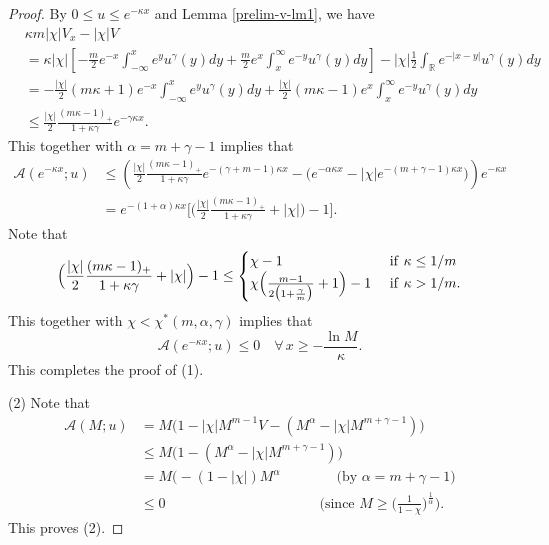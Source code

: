 \documentclass[11pt]{article} %
\theoremstyle{remark}
\theoremstyle{remark}
\numberwithin{equation}{section}
\numberwithin{figure}{section}
\numberwithin{table}{section}
\def\R{\mathbb R}
\begin{document}
\begin{proof}
By $0\le u\le e^{-\kappa x}$ and Lemma \ref{prelim-v-lm1}, we have 
\begin{align*}
&\kappa m |\chi| V_x-|\chi|V\\
&= \kappa |\chi|\left[ -\frac{m }{2}e^{- x}\int_{-\infty}^xe^{ y}u^\gamma (y)dy + \frac{m }{2}e^{x}\int_{x}^{\infty}e^{- y}u^\gamma (y)dy\right]-|\chi| \frac{1 }{2}\int_{\R}e^{- |x-y|}u^\gamma (y)dy
\\
&=-\frac{|\chi|}{2}(m\kappa +1)e^{-x}\int_{-\infty}^ x e^y u^\gamma (y)dy +\frac{|\chi|}{2}(m\kappa-1)e^{x}\int_x^\infty e^{-y} u^\gamma (y)dy\\
&\le \frac{|\chi|}{2}\frac{(m\kappa -1)_+}{1+\kappa \gamma} e^{-\gamma \kappa x}.
\end{align*}
This  together with $\alpha= m+\gamma-1$ implies that
\begin{align*}
\mathcal{A} (e^{-\kappa x};u)&\le  \left (\frac{|\chi|}{2}\frac{(m\kappa -1)_+}{1+\kappa \gamma} e^{-(\gamma+m-1) \kappa x}  -\big( e^{- \alpha \kappa x}-|\chi| e^{-(m+\gamma -1)\kappa x}\big)\right) e^{-\kappa x}\\
&=  e^{-(1+\alpha )\kappa x}\Big[
\Big( \frac{|\chi|}{2} \frac{(m\kappa -1)_+}{1+\kappa \gamma}+|\chi|\Big)  -1\Big].
\end{align*}
Note that
\begin{align*}
\Big( \frac{|\chi|}{2} \frac{(m\kappa -1)_+}{1+\kappa \gamma}+|\chi|\Big) -1\le\begin{cases} \chi-1\quad & {\rm if}\,\,\kappa\le 1/m\cr
 \chi \Big(\frac{m-1}{2\big(1+\frac{\gamma}{m}\big)}+1\Big)-1\,\, & {\rm if}\,\, \kappa>1/m.
\end{cases}
\end{align*}
This together with $\chi<\chi^*(m,\alpha,\gamma)$ implies that
$$
\mathcal{A} (e^{-\kappa x};u)\le 0\quad \forall\,x\ge  -\frac{\ln M}{\kappa}.
$$
This completes the proof of (1).
\smallskip


(2)  Note that
\begin{align*}
\mathcal{A}(M;u)&= M\big(1- |\chi| M ^{m-1} V -(M^\alpha -|\chi| M^{m+\gamma-1})\big)\\
&\le M \big(1-(M^\alpha -|\chi| M^{m+\gamma-1})\big)\\
&=M\big(-(1-|\chi|) M^\alpha \qquad\qquad \text{(by}\,\, \alpha=m+\gamma-1)\\
&\le 0 \qquad\qquad\qquad \qquad\qquad \quad \big(\text{since}\,\, M\ge \big(\frac{1}{1-\chi}\big)^{\frac{1}{\alpha}}\big).
\end{align*}
This proves (2).
\end{proof}
\end{document}
